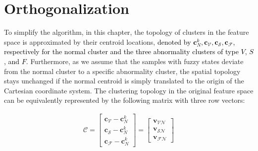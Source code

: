  
\section{Orthogonalization}

To simplify the algorithm, in this chapter, the topology of clusters in the feature space is approximated by their centroid locations, \textcolor{black}{denoted by $\mathbf{c}_N^k, \mathbf{c}_{\mathcal{V}}, \mathbf{c}_{\mathcal{S}}, \mathbf{c}_{\mathcal{F}}$, respectively for the normal cluster and the three abnormality clusters of type $V$, $S$, and $F$.} Furthermore, as we assume that the samples with fuzzy states deviate from the normal cluster to a specific abnormality cluster, the spatial topology stays unchanged if the normal centroid is simply translated to the origin of the Cartesian coordinate system. The clustering topology in the original feature space can be equivalently represented by the following matrix with three row vectors:

\begin{align}
\mathcal{C} = 
\begin{bmatrix}
\mathbf{c}_{\mathcal{V}} - \mathbf{c}_N^k \\
\mathbf{c}_{\mathcal{S}} - \mathbf{c}_N^k \\
\mathbf{c}_{\mathcal{F}} - \mathbf{c}_N^k
\end{bmatrix} = 
\begin{bmatrix}
\mathbf{v}_{\mathcal{VN}} \\
\mathbf{v}_{\mathcal{SN}} \\
\mathbf{v}_{\mathcal{FN}}
\end{bmatrix}
\end{align}


